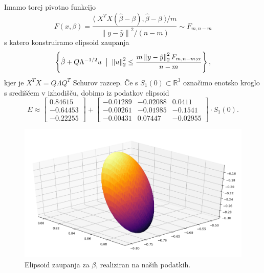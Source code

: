 \documentclass[ letterpaper, titlepage, fleqn]{article}
\newcommand{\R}{\mathbb R}
\newcommand{\norm}[1]{\left\lVert#1\right\rVert}
\newcommand{\scalar}[1]{\langle\;#1\;\rangle}
\begin{document}
\subsubsection{}
Imamo torej pivotno funkcijo
$$F(x, \beta) = \frac{\scalar{X^T X  (\hat{\beta} - \beta), \hat{\beta} - \beta} / m}{\norm{y - \hat{y}}^2 / (n-m)} \sim F_{m, n-m}$$
s katero konstruiramo elipsoid zaupanja 
$$\left\{\hat{\beta} + Q\Lambda^{-1/2} u \;\bigm|\; \norm{u}_2^2 \leq \frac{m\norm{y - \hat{y}}_2^2  F_{m, n-m; \alpha} }{n-m}\right\},$$
kjer je $X^TX = Q\Lambda Q^T$ Schurov razcep. Če s $S_1(0) \subset \R^3$ označimo enotsko kroglo s središčem v izhodišču, dobimo iz podatkov elipsoid 
$$E \approx
\begin{bmatrix}
0.84615 \\
-0.64453  \\
-0.22255  
\end{bmatrix}
+ 
\begin{bmatrix}
-0.01289 & -0.02088 & 0.0411 \\
-0.00261 & -0.01985 & -0.1541 \\
-0.00431 & 0.07447 & -0.02955
\end{bmatrix}
\cdot S_1(0).
$$
\begin{center}
\begin{figure}[h]
\includegraphics[width=16cm]{graphics/ConfidenceElipsoid1.png}
\caption{Elipsoid zaupanja za $\beta$, realiziran na naših podatkih.}
\end{figure}
\end{center}
\end{document}
